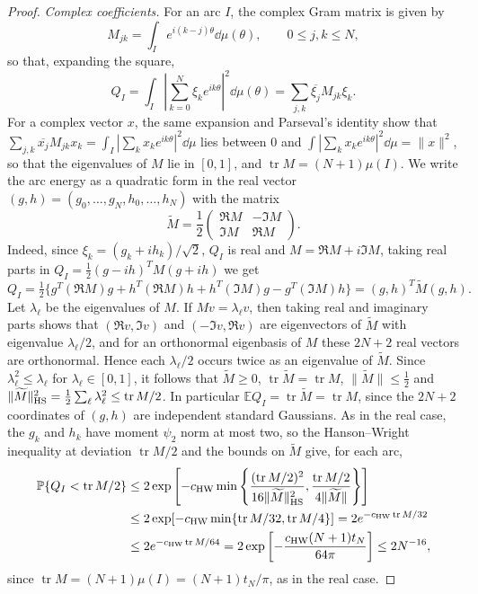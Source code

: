 \begin{proof}
\emph{Complex coefficients.}
For an arc $I$, the complex Gram matrix is given by
\[
 M_{jk}=\int_Ie^{i(k-j)\theta}\dd\mu(\theta),\qquad 0\le j,k\le N,
\]
so that, expanding the square,
\[
 Q_I=\int_I\left|\sum_{k=0}^N\xi_ke^{ik\theta}\right|^2\dd\mu(\theta)
 =\sum_{j,k}\overline{\xi_j}M_{jk}\xi_k.
\]
For a complex vector $x$, the same expansion and Parseval's identity show
that
$\sum_{j,k}\overline{x_j}M_{jk}x_k=\int_I|\sum_kx_ke^{ik\theta}|^2\dd\mu$
lies between $0$ and $\int|\sum_kx_ke^{ik\theta}|^2\dd\mu=\|x\|^2$, so
that the eigenvalues of $M$ lie in $[0,1]$, and
$\operatorname{tr}M=(N+1)\mu(I)$.
We write the arc energy as a quadratic form in the real vector
$(g,h)=(g_0,\ldots,g_N,h_0,\ldots,h_N)$ with the matrix
\[
 \widetilde M=\frac12
 \begin{pmatrix}\Re M&-\Im M\\\Im M&\Re M\end{pmatrix}.
\]
Indeed, since
$\xi_k=(g_k+ih_k)/\sqrt2$, $Q_I$ is real and $M=\Re M+i\Im M$, taking real
parts in $Q_I=\tfrac12(g-ih)^TM(g+ih)$ we get
\[
 Q_I=\tfrac12\bigl\{g^T(\Re M)g+h^T(\Re M)h+h^T(\Im M)g-g^T(\Im M)h\bigr\}
 =(g,h)^T\widetilde M(g,h).
\]
Let $\lambda_\ell$ be the eigenvalues of $M$.
If $Mv=\lambda_\ell v$, then taking real and imaginary parts shows that
$(\Re v,\Im v)$ and $(-\Im v,\Re v)$ are eigenvectors of $\widetilde M$
with eigenvalue $\lambda_\ell/2$, and for an orthonormal eigenbasis of $M$
these $2N+2$ real vectors are orthonormal.
Hence each $\lambda_\ell/2$ occurs twice as an eigenvalue of
$\widetilde M$. Since $\lambda_\ell^2\le\lambda_\ell$ for
$\lambda_\ell\in[0,1]$, it follows that $\widetilde M\ge0$,
$\operatorname{tr}\widetilde M=\operatorname{tr}M$,
$\|\widetilde M\|\le\frac12$ and
$\|\widetilde M\|_{\rm HS}^2
 =\frac12\sum_\ell\lambda_\ell^2\le\operatorname{tr}M/2$.
In particular $\mathbb EQ_I=\operatorname{tr}\widetilde M=\operatorname{tr}M$,
since the $2N+2$ coordinates of $(g,h)$ are independent standard Gaussians.
As in the real case, the $g_k$ and $h_k$ have moment $\psi_2$ norm at
most two, so the Hanson--Wright inequality at deviation
$\operatorname{tr}M/2$ and the bounds on $\widetilde M$ give, for each
arc,
\begin{align*}
 \mathbb P\{Q_I<\operatorname{tr}M/2\}
 &\le2\exp\left[-c_{\rm HW}\min\left\{
   \frac{(\operatorname{tr}M/2)^2}{16\|\widetilde M\|_{\rm HS}^2},
   \frac{\operatorname{tr}M/2}{4\|\widetilde M\|}\right\}\right]\\
 &\le2\exp[-c_{\rm HW}\min\{\operatorname{tr}M/32,\operatorname{tr}M/4\}]
 =2e^{-c_{\rm HW}\operatorname{tr}M/32}\\
 &\le2e^{-c_{\rm HW}\operatorname{tr}M/64}
 =2\exp\left[-\frac{c_{\rm HW}(N+1)t_N}{64\pi}\right]
 \le2N^{-16},
\end{align*}
since $\operatorname{tr}M=(N+1)\mu(I)=(N+1)t_N/\pi$, as in the real case.


\end{proof}
